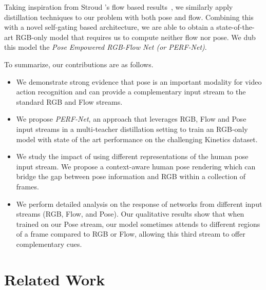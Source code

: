 \documentclass[10pt,twocolumn,letterpaper]{article}
\begin{document}
Taking inspiration from Stroud \etal’s flow based results~\cite{stroud2020d3d}, we similarly apply distillation techniques to our problem with both pose and flow.  Combining this with a novel self-gating based architecture, we are able to obtain a state-of-the-art RGB-only model that requires us to compute neither flow nor pose. We dub this model the \emph{Pose Empowered RGB-Flow Net (or PERF-Net)}.


To summarize, our contributions are as follows.
\vspace{-0.2cm}
\begin{itemize}
\item We demonstrate strong evidence that pose is an important modality for video action recognition and can provide a complementary input stream to the standard RGB and Flow streams. 
\vspace{-0.2cm}
\item We propose \emph{PERF-Net}, an approach that leverages RGB, Flow and Pose input streams in a multi-teacher distillation setting to train an RGB-only model with state of the art performance on the challenging Kinetics dataset.
\vspace{-0.2cm}
\item We study the impact of using different representations of the human pose input stream. We propose a context-aware human pose rendering which can bridge the gap between pose information and RGB within a collection of frames.
\vspace{-0.2cm}
\item We perform detailed analysis on the response of networks from different input streams (RGB, Flow, and Pose).  Our 
qualitative   results show that when trained on our Pose stream, our model sometimes attends to different regions of a frame compared to RGB or Flow, allowing this third stream to offer complementary cues.


\end{itemize}























\section{Related Work}\label{sec:related}
\end{document}
